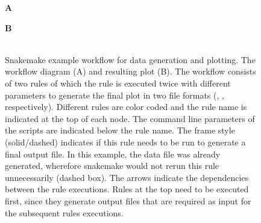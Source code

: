 \begin{figure}
    \begin{minipage}[t]{0.4\textwidth}
    \textbf{A}\\
    
    \end{minipage}
    \begin{minipage}[t]{0.6\textwidth}
    \textbf{B}\\
    \\
    \end{minipage}
 \caption[Snakemake example workflow for data generation and plotting]{Snakemake example workflow for data generation and plotting. The workflow diagram (A) and resulting plot (B). The workflow consists of two rules of which the  rule is executed twice with different parameters to generate the final plot in two file formats (, , respectively). Different rules are color coded and the rule name is indicated at the top of each node.  The command line parameters of the scripts are indicated below the rule name. The frame style (solid/dashed) indicates if this rule needs to be run to generate a final output file. In this example, the data file was already generated, wherefore snakemake would not rerun this rule unnecessarily (dashed box). The arrows indicate the dependencies between the rule executions. Rules at the top need to be executed first, since they generate output files that are required as input for the subsequent rules executions.}
\label{fig:python_demo}
\end{figure}


